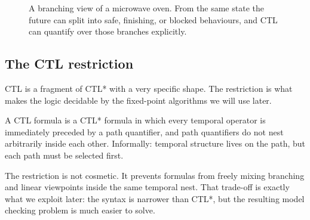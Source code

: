 \begin{figure}[ht]
  \centering
  \caption{A branching view of a microwave oven.  From the same state the
           future can split into safe, finishing, or blocked behaviours, and
           CTL can quantify over those branches explicitly.}
  \label{fig:microwave-ctl}
\end{figure}

\subsection{The CTL restriction}

CTL is a fragment of CTL* with a very specific shape.  The restriction is
what makes the logic decidable by the fixed-point algorithms we will use
later.

\begin{definition}
A CTL formula is a CTL* formula in which every temporal operator is
immediately preceded by a path quantifier, and path quantifiers do not nest
arbitrarily inside each other.  Informally: temporal structure lives on the
path, but each path must be selected first.
\end{definition}

The restriction is not cosmetic.  It prevents formulas from freely mixing
branching and linear viewpoints inside the same temporal nest.  That trade-off
is exactly what we exploit later: the syntax is narrower than CTL*, but the
resulting model checking problem is much easier to solve.


